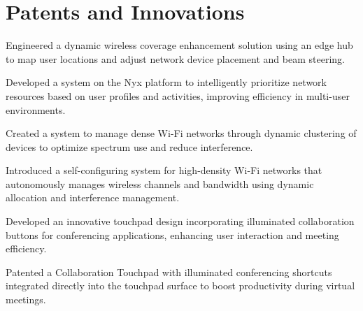 \documentclass[]{resume-openfont}
\begin{document}
\begin{minipage}[t]{1\textwidth}
    \section{Patents and Innovations}
    \titlerule
    \vspace{2.5 mm}
    
    \descript{}
    Engineered a dynamic wireless coverage enhancement solution using an edge hub to map user locations and adjust network device placement and beam steering.
    \sectionsep
    
    \descript{}
    Developed a system on the Nyx platform to intelligently prioritize network resources based on user profiles and activities, improving efficiency in multi-user environments.
    \sectionsep
    
    \descript{}
    Created a system to manage dense Wi-Fi networks through dynamic clustering of devices to optimize spectrum use and reduce interference.
    \sectionsep
    
    \descript{}
    Introduced a self-configuring system for high-density Wi-Fi networks that autonomously manages wireless channels and bandwidth using dynamic allocation and interference management.
    \sectionsep
    
    \descript{}
    Developed an innovative touchpad design incorporating illuminated collaboration buttons for conferencing applications, enhancing user interaction and meeting efficiency.
    \sectionsep
    
    \descript{}
    Patented a Collaboration Touchpad with illuminated conferencing shortcuts integrated directly into the touchpad surface to boost productivity during virtual meetings.
    \sectionsep
    
    \end{minipage}
    
\end{document}
